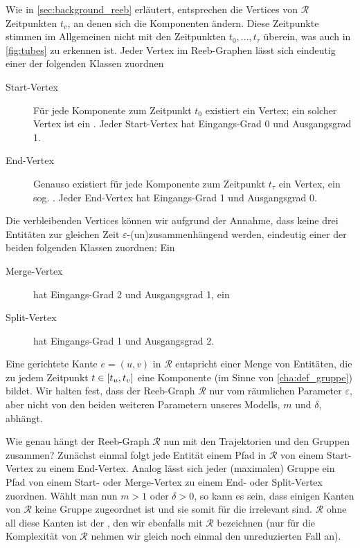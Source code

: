 Wie in \cref{sec:background_reeb} erläutert, entsprechen die Vertices von $\mathcal{R}$ Zeitpunkten $t_v$, an denen sich die Komponenten ändern.
Diese Zeitpunkte stimmen im Allgemeinen nicht mit den Zeitpunkten $t_0, \ldots, t_\tau$ überein, was auch in \cref{fig:tubes} zu erkennen ist.
Jeder Vertex im Reeb-Graphen lässt sich eindeutig einer der folgenden Klassen zuordnen
\begin{description}
	\item[Start-Vertex] Für jede Komponente zum Zeitpunkt $t_0$ existiert ein Vertex; ein solcher Vertex ist ein .
	Jeder Start-Vertex hat Eingangs-Grad 0 und Ausgangsgrad 1.
	\item[End-Vertex] Genauso existiert für jede Komponente zum Zeitpunkt $t_\tau$ ein Vertex, ein sog. .
	Jeder End-Vertex hat Eingangs-Grad 1 und Ausgangsgrad 0.
\end{description}
Die verbleibenden Vertices können wir aufgrund der Annahme, dass keine drei Entitäten zur gleichen Zeit $\varepsilon$-(un)zusammenhängend werden, eindeutig einer der beiden folgenden Klassen zuordnen: Ein
\begin{description}
	\item[Merge-Vertex] hat Eingangs-Grad 2 und Ausgangsgrad 1, ein
	\item[Split-Vertex] hat Eingangs-Grad 1 und Ausgangsgrad 2.
\end{description}
Eine gerichtete Kante $e=(u,v)$ in $\mathcal{R}$ entspricht einer Menge von Entitäten, die zu jedem Zeitpunkt $t \in \benbrace*{t_u,t_v}$ eine Komponente (im Sinne von \cref{cha:def_gruppe}) bildet.
Wir halten fest, dass der Reeb-Graph $\mathcal{R}$ nur vom räumlichen Parameter $\varepsilon$, aber nicht von den beiden weiteren Parametern unseres Modells, $m$ und $\delta$, abhängt.

Wie genau hängt der Reeb-Graph $\mathcal{R}$ nun mit den Trajektorien und den Gruppen zusammen? 
Zunächst einmal folgt jede Entität einem Pfad in $\mathcal{R}$ von einem Start-Vertex zu einem End-Vertex.
Analog lässt sich jeder (maximalen) Gruppe ein Pfad von einem Start- oder Merge-Vertex zu einem End- oder Split-Vertex zuordnen.
Wählt man nun $m > 1$ oder $\delta > 0$, so kann es sein, dass einigen Kanten von $\mathcal{R}$ keine Gruppe zugeordnet ist und sie somit für die \GrpStruktur irrelevant sind.
$\mathcal{R}$ ohne all diese Kanten ist der , den wir ebenfalls mit $\mathcal{R}$ bezeichnen (nur für die Komplexität von $\mathcal{R}$ nehmen wir gleich noch einmal den unreduzierten Fall an).


